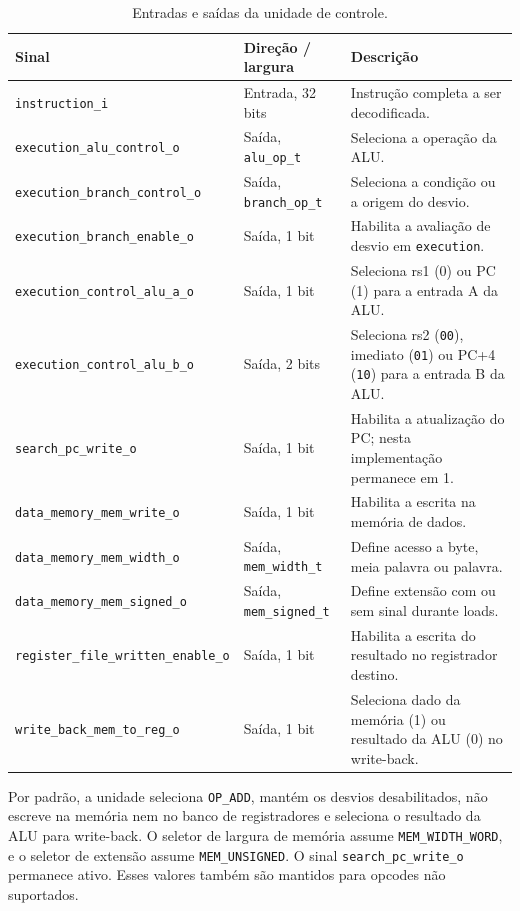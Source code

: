 \begin{table}[!htb]
\centering
\caption{Entradas e saídas da unidade de controle.}
\label{tab:control-unit-ports}
\begin{tabular}{p{4.1cm}p{2.1cm}p{8.0cm}}
\toprule
\textbf{Sinal} & \textbf{Direção / largura} & \textbf{Descrição} \\
\midrule
\texttt{instruction\_i} & Entrada, 32 bits & Instrução completa a ser decodificada. \\
\texttt{execution\_alu\_control\_o} & Saída, \texttt{alu\_op\_t} & Seleciona a operação da ALU. \\
\texttt{execution\_branch\_control\_o} & Saída, \texttt{branch\_op\_t} & Seleciona a condição ou a origem do desvio. \\
\texttt{execution\_branch\_enable\_o} & Saída, 1 bit & Habilita a avaliação de desvio em \texttt{execution}. \\
\texttt{execution\_control\_alu\_a\_o} & Saída, 1 bit & Seleciona rs1 (0) ou PC (1) para a entrada A da ALU. \\
\texttt{execution\_control\_alu\_b\_o} & Saída, 2 bits & Seleciona rs2 (\texttt{00}), imediato (\texttt{01}) ou PC+4 (\texttt{10}) para a entrada B da ALU. \\
\texttt{search\_pc\_write\_o} & Saída, 1 bit & Habilita a atualização do PC; nesta implementação permanece em 1. \\
\texttt{data\_memory\_mem\_write\_o} & Saída, 1 bit & Habilita a escrita na memória de dados. \\
\texttt{data\_memory\_mem\_width\_o} & Saída, \texttt{mem\_width\_t} & Define acesso a byte, meia palavra ou palavra. \\
\texttt{data\_memory\_mem\_signed\_o} & Saída, \texttt{mem\_signed\_t} & Define extensão com ou sem sinal durante loads. \\
\texttt{register\_file\_written\_enable\_o} & Saída, 1 bit & Habilita a escrita do resultado no registrador destino. \\
\texttt{write\_back\_mem\_to\_reg\_o} & Saída, 1 bit & Seleciona dado da memória (1) ou resultado da ALU (0) no write-back. \\
\bottomrule
\end{tabular}
\end{table}

Por padrão, a unidade seleciona \texttt{OP\_ADD}, mantém os desvios desabilitados, não escreve na memória nem no banco de registradores e seleciona o resultado da ALU para write-back. O seletor de largura de memória assume \texttt{MEM\_WIDTH\_WORD}, e o seletor de extensão assume \texttt{MEM\_UNSIGNED}. O sinal \texttt{search\_pc\_write\_o} permanece ativo. Esses valores também são mantidos para opcodes não suportados.

